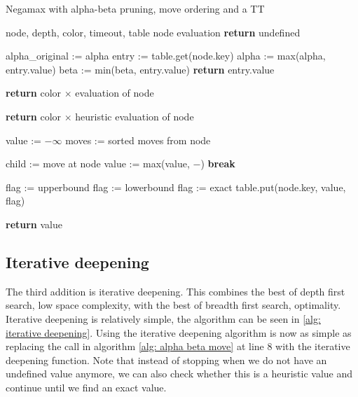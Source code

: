 \documentclass[a4paper]{article}
\begin{document}
\begin{algorithm}
	\caption{Negamax with alpha-beta pruning, move ordering and a TT}
	\label{alg: insane}
	\begin{algorithmic}[1]
		\Require node, depth, color, timeout, table
		\Ensure node evaluation
				\State \textbf{return} undefined
			\EndIf

			\State alpha\_original := alpha
			\State entry := table.get(node.key)
					\State alpha := max(alpha, entry.value)
					\State beta := min(beta, entry.value)
				\Else
					\State \textbf{return} entry.value
				\EndIf
			\EndIf

				\State \textbf{return} color $\times$ evaluation of node
			\EndIf

				\State \textbf{return} color $\times$ heuristic evaluation of node
			\EndIf

			\State value := $-\infty$
			\State moves := sorted moves from node

				\State child := move at node
				\State value := max(value, $-$)
					\State \textbf{break}
				\EndIf
			\EndFor

					\State flag := upperbound
					\State flag := lowerbound
				\Else
					\State flag := exact
				\EndIf
				\State table.put(node.key, value, flag)
			\EndIf

			\State \textbf{return} value
		\EndFunction
	\end{algorithmic}
\end{algorithm}

\subsection{Iterative deepening}
The third addition is iterative deepening. This combines the best of depth
first search, low space complexity, with the best of breadth first search,
optimality. Iterative deepening is relatively simple, the algorithm can be seen
in \ref{alg: iterative deepening}. Using the iterative deepening algorithm is
now as simple as replacing the call in algorithm \ref{alg: alpha beta move} at
line 8 with the iterative deepening function. Note that instead of stopping
when we do not have an undefined value anymore, we can also check whether this
is a heuristic value and continue until we find an exact value.
\end{document}
